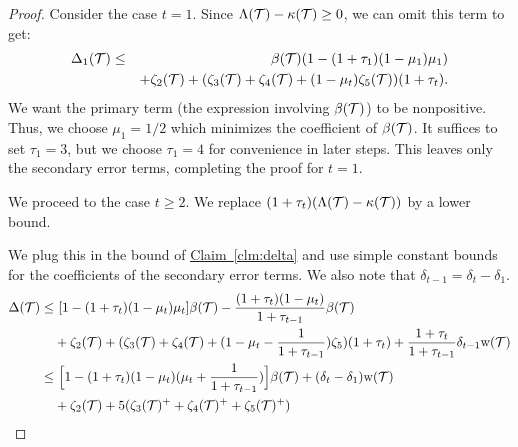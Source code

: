 \documentclass{acmsmall}
\newcommand{\cT}{{\cal T}}
\newcommand{\Clm}[1]{\hyperref[clm:#1]{Claim~\ref*{clm:#1}}} %
\newcommand{\width}{{\bf {\rm  w}}}
\newcommand{\errorterm}{\zeta}
\begin{document}
\begin{proof} 
Consider the case $t=1$. Since 
$\Lambda(\cT)-\kappa(\cT) \geq 0$, we can omit this term to get:
%
\begin{eqnarray}
\Delta_1(\cT) & \leq & \beta(\cT)(1  - (1+\tau_1)(1-\mu_1)\mu_1) \nonumber \\
&& +\errorterm_2(\cT)+(\errorterm_3(\cT)+\errorterm_4(\cT)+(1-\mu_t)\errorterm_5(\cT))(1+\tau_t) \label{eqn:delta}.
\end{eqnarray}
%
We want the primary term (the expression involving $\beta(\cT)$) to be nonpositive.  
Thus, we choose $\mu_1=1/2$ which minimizes the coefficient of $\beta(\cT)$.  
It suffices to set $\tau_1 = 3$, but we choose $\tau_1=4$ for convenience in later steps.
This leaves only the secondary error terms, completing the proof for $t=1$.
%
%
%
%

We proceed to the case $t\geq2$.  We replace 
$(1+\tau_t)(\Lambda(\cT)-\kappa(\cT))$ by a lower bound.


We plug this in the bound of \Clm{delta} and use simple constant bounds for the coefficients of the secondary error terms.
We also note that $\delta_{t-1} = \delta_t - \delta_1$.
\begin{align}
\nonumber
\Delta(\cT) 
\leq & \ [1-(1+\tau_t)(1-\mu_t)\mu_t]\beta(\cT) - \frac{(1+\tau_t)(1-\mu_t)}{1+\tau_{t-1}}\beta(\cT)\\
& +\errorterm_2(\cT)+(\errorterm_3(\cT)+\errorterm_4(\cT)+(1-\mu_t-\frac{1}{1+\tau_{t-1}})\errorterm_5)(1+\tau_t)+\frac{1+\tau_t}{1+\tau_{t-1}}\delta_{t-1}\width(\cT)\\
\nonumber
\leq & \ \Big[1-(1+\tau_t)(1-\mu_t)(\mu_t+\frac{1}{1+\tau_{t-1}})\Big]\beta(\cT) + (\delta_t - \delta_1)\width(\cT)\\
\label{Delta 4}
& +\errorterm_2(\cT)+5(\errorterm_3(\cT)^+ +\errorterm_4(\cT)^+ + \errorterm_5(\cT)^+)
\end{align}
  

\end{proof}
\end{document}
